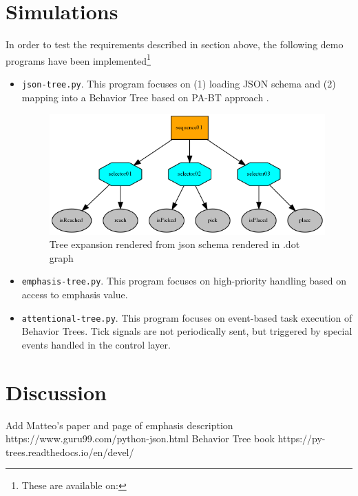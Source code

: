 \documentclass[conference]{IEEEtran}
\begin{document}
\section{Simulations}
In order to test the requirements described in section above, the following demo programs have been implemented\footnote{These are available on:}
\begin{itemize}
\item \verb|json-tree.py|. This program focuses on (1) loading JSON schema and (2) mapping into a Behavior Tree based on PA-BT approach \cite{b3}.

\begin{figure}
  \includegraphics[width=\linewidth]{demo-json.png}
  \caption{Tree expansion rendered from json schema rendered in .dot graph}
  \label{fig:json-tree}
\end{figure}

\item \verb|emphasis-tree.py|. This program focuses on high-priority handling based on access to emphasis value\cite{b1}.
\item \verb|attentional-tree.py|. This program focuses on event-based task execution of Behavior Trees. Tick signals are not periodically sent, but triggered by special events handled in the control layer.
\end{itemize}
\section*{Discussion}




\begin{thebibliography}{00}
 Add Matteo's paper and page of emphasis description
https://www.guru99.com/python-json.html
 Behavior Tree book
 https://py-trees.readthedocs.io/en/devel/
\end{thebibliography}
\end{document}
